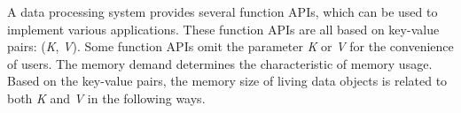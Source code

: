 A data processing system provides several function APIs, which can be used to implement various applications. 
These function APIs are all based on key-value pairs: (\textit{K}, \textit{V}). Some function APIs omit the parameter \textit{K} or \textit{V} for the convenience of users.
The memory demand determines the characteristic of memory usage. Based on the key-value pairs, the memory size of living data objects is related to both \textit{K} and \textit{V} in the following ways.

